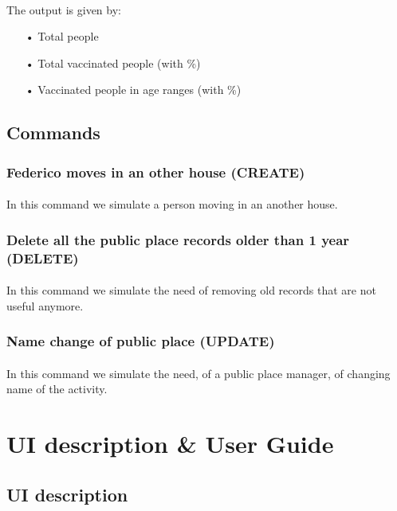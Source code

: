 \documentclass[a4paper,12pt]{article}
\begin{document}
\paragraph{} The output is given by: 
\begin{itemize}
\item[•] Total people
\item[•] Total vaccinated people (with \%)
\item[•] Vaccinated people in age ranges (with \%)

\end{itemize}

\subsection{Commands}
\subsubsection{Federico moves in an other house (CREATE)}
\paragraph{} In this command we simulate a person moving in an another house.


\subsubsection{Delete all the public place records older than 1 year (DELETE) }
\paragraph{} In this command we simulate the need of removing old records that are not useful anymore.


\subsubsection{Name change of public place (UPDATE)}
\paragraph{} In this command we simulate the need, of a public place manager, of changing name of the activity.

\clearpage
\section{UI description \& User Guide}
\subsection{UI description}
\end{document}
